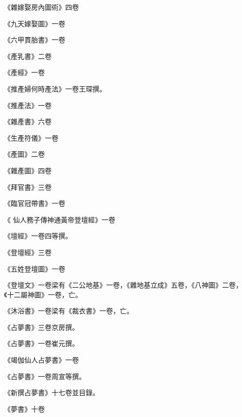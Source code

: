 \begin{pinyinscope}
 《雜嫁娶房內圖術》四卷



 《九天嫁娶圖》一卷



 《六甲貫胎書》一卷



 《產乳書》二卷



 《產經》一卷



 《推產婦何時產法》一卷王琛撰。



 《推產法》一卷



 《雜產書》六卷



 《生產符儀》一卷



 《產圖》二卷



 《雜產圖》四卷



 《拜官書》三卷



 《臨官冠帶書》一卷



 《
 仙人務子傳神通黃帝登壇經》一卷



 《壇經》一卷四等撰。



 《登壇經》三卷



 《五姓登壇圖》一卷



 《登壇文》一卷梁有《二公地基》一卷，《雜地基立成》五卷，《八神圖》二卷，《十二屬神圖》一卷，亡。



 《沐浴書》一卷梁有《裁衣書》一卷，亡。



 《占夢書》三卷京房撰。



 《占夢書》一卷崔元撰。



 《竭伽仙人占夢書》一卷



 《占夢書》一卷周宣等撰。



 《新撰占夢書》十七卷並目錄。



 《夢書》十卷




\end{pinyinscope}

